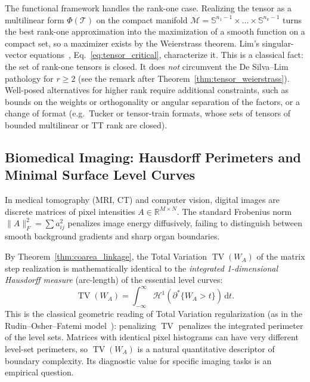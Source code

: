 \documentclass[11pt,a4paper,reqno]{amsart}
\theoremstyle{definition}
\numberwithin{equation}{section}
\providecommand{\R}{\mathbb{R}}
\providecommand{\Sph}{\mathbb{S}}
\providecommand{\TV}{\operatorname{TV}}
\newcommand{\dif}{\,\mathrm{d}}
\begin{document}
The functional framework handles the rank-one case. Realizing the tensor as a multilinear form $\Phi(\mathcal{T})$ on the compact manifold $\mathcal{M} = \Sph^{n_1-1} \times \dots \times \Sph^{n_k-1}$ turns the best rank-one approximation into the maximization of a smooth function on a compact set, so a maximizer exists by the Weierstrass theorem. Lim's singular-vector equations~\cite{lim2005singular}, Eq.~\eqref{eq:tensor_critical}, characterize it. This is a classical fact: the set of rank-one tensors is closed. It does \emph{not} circumvent the De Silva--Lim pathology for $r \ge 2$ (see the remark after Theorem~\ref{thm:tensor_weierstrass}). Well-posed alternatives for higher rank require additional constraints, such as bounds on the weights or orthogonality or angular separation of the factors, or a change of format (e.g.\ Tucker or tensor-train formats, whose sets of tensors of bounded multilinear or TT rank are closed).

\subsection{Biomedical Imaging: Hausdorff Perimeters and Minimal Surface Level Curves}
\label{subsec:imp_imaging}
In medical tomography (MRI, CT) and computer vision, digital images are discrete matrices of pixel intensities $A \in \R^{M \times N}$. The standard Frobenius norm $\|A\|_F^2 = \sum a_{ij}^2$ penalizes image energy diffusively, failing to distinguish between smooth background gradients and sharp organ boundaries.

By Theorem~\ref{thm:coarea_linkage}, the Total Variation $\TV(W_A)$ of the matrix step realization is mathematically identical to the \emph{integrated 1-dimensional Hausdorff measure} (arc-length) of the essential level curves:
\begin{equation}
    \TV(W_A) = \int_{-\infty}^\infty \mathcal{H}^1(\partial^* \{W_A > t\}) \dif t.
\end{equation}
This is the classical geometric reading of Total Variation regularization (as in the Rudin--Osher--Fatemi model~\cite{rudin1992nonlinear}): penalizing $\TV$ penalizes the integrated perimeter of the level sets. Matrices with identical pixel histograms can have very different level-set perimeters, so $\TV(W_A)$ is a natural quantitative descriptor of boundary complexity. Its diagnostic value for specific imaging tasks is an empirical question.

\end{document}
